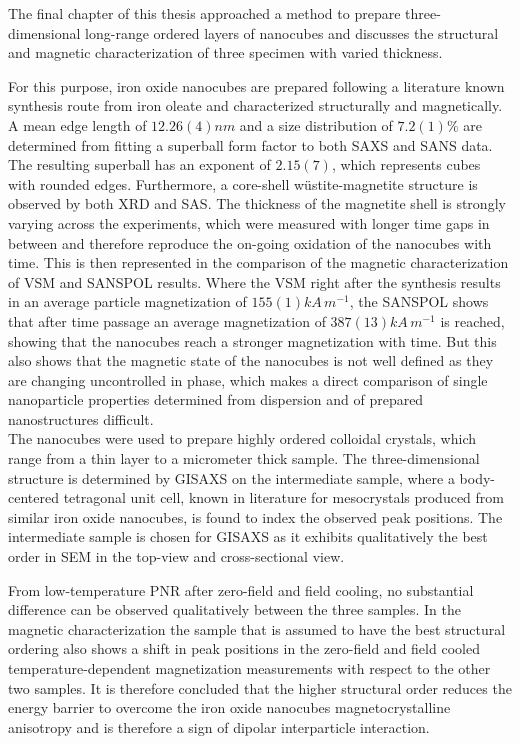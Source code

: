 \documentclass[\main/dresen_thesis.tex]{subfiles}
\begin{document}
  The final chapter of this thesis approached a method to prepare three-dimensional long-range ordered layers of nanocubes and discusses the structural and magnetic characterization of three specimen with varied thickness.

  For this purpose, iron oxide nanocubes are prepared following a literature known synthesis route from iron oleate and characterized structurally and magnetically.
  A mean edge length of $12.26(4) \unit{nm}$ and a size distribution of $7.2(1) \%$ are determined from fitting a superball form factor to both SAXS and SANS data.
  The resulting superball has an exponent of $2.15(7)$, which represents cubes with rounded edges.
  Furthermore, a core-shell w\"ustite-magnetite structure is observed by both XRD and SAS.
  The thickness of the magnetite shell is strongly varying across the experiments, which were measured with longer time gaps in between and therefore reproduce the on-going oxidation of the nanocubes with time.
  This is then represented in the comparison of the magnetic characterization of VSM and SANSPOL results.
  Where the VSM right after the synthesis results in an average particle magnetization of $155(1) \unit{kA\, m^{-1}}$, the SANSPOL shows that after time passage an average magnetization of $387(13) \unit{kA \, m^{-1}}$ is reached, showing that the nanocubes reach a stronger magnetization with time.
  But this also shows that the magnetic state of the nanocubes is not well defined as they are changing uncontrolled in phase, which makes a direct comparison of single nanoparticle properties determined from dispersion and of prepared nanostructures difficult.
  \\

  The nanocubes were used to prepare highly ordered colloidal crystals, which range from a thin layer to a micrometer thick sample.
  The three-dimensional structure is determined by GISAXS on the intermediate sample, where a body-centered tetragonal unit cell, known in literature for mesocrystals produced from similar iron oxide nanocubes, is found to index the observed peak positions.
  The intermediate sample is chosen for GISAXS as it exhibits qualitatively the best order in SEM in the top-view and cross-sectional view.

  From low-temperature PNR after zero-field and field cooling, no substantial difference can be observed qualitatively between the three samples.
  In the magnetic characterization the sample that is assumed to have the best structural ordering also shows a shift in peak positions in the zero-field and field cooled temperature-dependent magnetization measurements with respect to the other two samples.
  It is therefore concluded that the higher structural order reduces the energy barrier to overcome the iron oxide nanocubes magnetocrystalline anisotropy and is therefore a sign of dipolar interparticle interaction.
  \\
\end{document}

